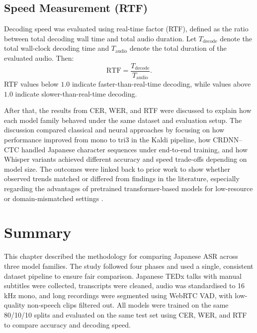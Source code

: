 \subsection{Speed Measurement (RTF)}
Decoding speed was evaluated using real-time factor (RTF), defined as the ratio
between total decoding wall time and total audio duration. Let $T_{\text{decode}}$
denote the total wall-clock decoding time and $T_{\text{audio}}$ denote the total
duration of the evaluated audio. Then:
\begin{equation}
\mathrm{RTF} = \frac{T_{\text{decode}}}{T_{\text{audio}}}.
\end{equation}
RTF values below $1.0$ indicate faster-than-real-time decoding, while values above
$1.0$ indicate slower-than-real-time decoding.

After that, the results from CER, WER, and RTF were discussed to explain how each model family behaved under the same dataset and evaluation setup. The discussion compared classical and neural approaches by focusing on how performance improved from mono to tri3 in the Kaldi pipeline, how CRDNN--CTC handled Japanese character sequences under end-to-end training, and how Whisper variants achieved different accuracy and speed trade-offs depending on model size. The outcomes were linked back to prior work to show whether observed trends matched or differed from findings in the literature, especially regarding the advantages of pretrained transformer-based models for low-resource or domain-mismatched settings \parencite{radford2023robust, bajo2024efficient}.

\section{Summary}
This chapter described the methodology for comparing Japanese ASR across three model families. The study followed four phases and used a single, consistent dataset pipeline to ensure fair comparison. Japanese TEDx talks with manual subtitles were collected, transcripts were cleaned, audio was standardised to 16\,kHz mono, and long recordings were segmented using WebRTC VAD, with low-quality non-speech clips filtered out. All models were trained on the same 80/10/10 splits and evaluated on the same test set using CER, WER, and RTF to compare accuracy and decoding speed.
